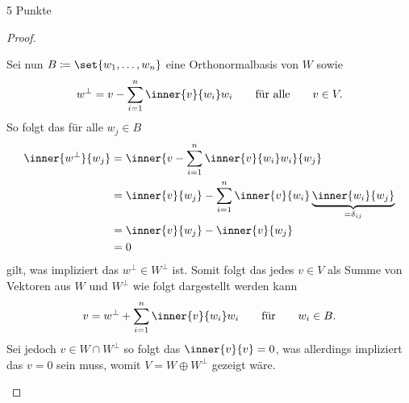 \documentclass{problemset}
\begin{document}
\begin{problem}{5 Punkte}
\begin{proof}
\begin{enumerate}
              Sei nun \(B \coloneq \set{w_1, \ldots, w_n}\) eine
              Orthonormalbasis von \(W\) sowie
              \begin{equation*}
                  w^\perp = v - \sum_{i=1}^n \inner{v}{w_i} w_i \qquad \text{für alle} \qquad v \in V.
              \end{equation*}
              So folgt das für alle \(w_j \in B\)
              \begin{align*}
                  \inner{w^\perp}{w_j} & = \inner{v - \sum_{i=1}^n \inner{v}{w_i} w_i}{w_j}                                           \\
                                       & = \inner {v}{w_j} - \sum_{i=1}^n \inner{v}{w_i} \underbrace{\inner{w_i}{w_j}}_{=\delta_{ij}} \\
                                       & = \inner {v}{w_j} - \inner {v}{w_j}                                                          \\
                                       & = 0
              \end{align*}
              gilt, was impliziert das \(w^\perp \in W^\perp\) ist.
              Somit folgt das jedes \(v \in V\) als Summe von Vektoren aus \(W\) und
              \(W^\perp\) wie folgt dargestellt werden kann
              \begin{equation*}
                  v = w^\perp + \sum_{i=1}^n \inner{v}{w_i} w_i \qquad \text{für} \qquad w_i \in B.
              \end{equation*}
              Sei jedoch \(v \in W \cap W^\perp\) so folgt das \(\inner{v}{v} = 0\), was
              allerdings impliziert das \(v = 0\) sein muss, womit \(V = W \oplus W^\perp\)
              gezeigt wäre.


\end{enumerate}
\end{proof}
\end{problem}
\end{document}
